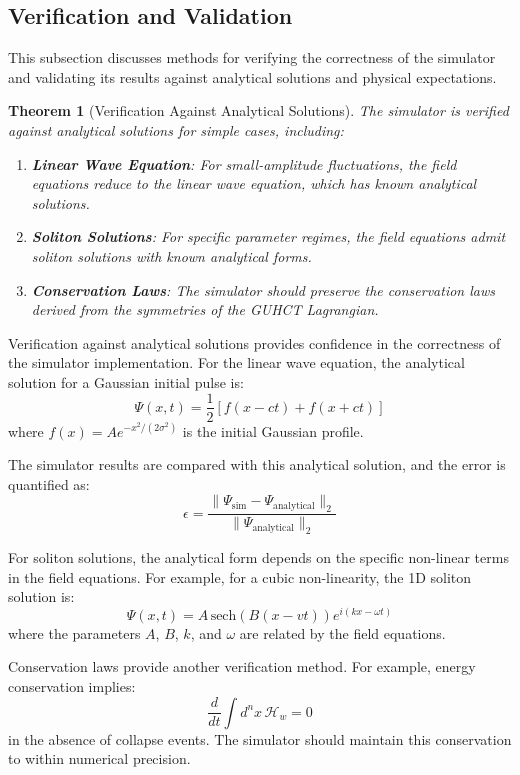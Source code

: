 \documentclass[11pt,a4paper]{article}
\makeatletter
\newtheorem{theorem}{Theorem}[section]
\renewenvironment{proof}[1][\proofname]{\par
  \pushQED{\qed}%
  \normalfont \topsep6\p@\@plus6\p@\relax
  \trivlist
  \item[\hskip\labelsep
        \itshape
    #1\@addpunct{.}]\ignorespaces
}{%
  \popQED\endtrivlist\@endpefalse
}
\makeatother
\begin{document}
\subsection{Verification and Validation}
\label{subsec:verification_validation}

This subsection discusses methods for verifying the correctness of the simulator and validating its results against analytical solutions and physical expectations.

\begin{theorem}[Verification Against Analytical Solutions]
\label{thm:verification}
The simulator is verified against analytical solutions for simple cases, including:
\begin{enumerate}
    \item \textbf{Linear Wave Equation}: For small-amplitude fluctuations, the field equations reduce to the linear wave equation, which has known analytical solutions.
    
    \item \textbf{Soliton Solutions}: For specific parameter regimes, the field equations admit soliton solutions with known analytical forms.
    
    \item \textbf{Conservation Laws}: The simulator should preserve the conservation laws derived from the symmetries of the GUHCT Lagrangian.
\end{enumerate}
\end{theorem}

\begin{proof}
Verification against analytical solutions provides confidence in the correctness of the simulator implementation. For the linear wave equation, the analytical solution for a Gaussian initial pulse is:
\begin{equation}
\Psi(x,t) = \frac{1}{2}[f(x-ct) + f(x+ct)]
\end{equation}
where $f(x) = A e^{-x^2/(2\sigma^2)}$ is the initial Gaussian profile.

The simulator results are compared with this analytical solution, and the error is quantified as:
\begin{equation}
\epsilon = \frac{\|\Psi_{\text{sim}} - \Psi_{\text{analytical}}\|_2}{\|\Psi_{\text{analytical}}\|_2}
\end{equation}

For soliton solutions, the analytical form depends on the specific non-linear terms in the field equations. For example, for a cubic non-linearity, the 1D soliton solution is:
\begin{equation}
\Psi(x,t) = A \, \text{sech}(B(x-vt)) e^{i(kx-\omega t)}
\end{equation}
where the parameters $A$, $B$, $k$, and $\omega$ are related by the field equations.

Conservation laws provide another verification method. For example, energy conservation implies:
\begin{equation}
\frac{d}{dt} \int d^nx \, \mathcal{H}_w = 0
\end{equation}
in the absence of collapse events. The simulator should maintain this conservation to within numerical precision.
\end{proof}
\end{document}
